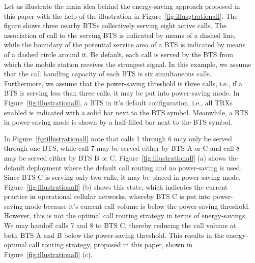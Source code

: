 Let us illustrate the main idea behind the energy-saving approach proposed in this paper with the help of the illustration in Figure~\ref{fig:illusgtrationall}. The figure shows three nearby BTSs collectively serving eight active calls. The association of call to the serving BTS is indicated by means of a dashed line, while the boundary of the potential service area of a BTS is indicated by means of a dashed circle around it. Be default, each call is served by the BTS from which the mobile station receives the strongest signal. In this example, we assume that the call handling capacity of each BTS is six simultaneous calls. Furthermore, we assume that the power-saving threshold is three calls, i.e., if a BTS is serving less than three calls, it may be put into power-saving mode. In Figure~\ref{fig:illustrationall}, a BTS in it's default configuration, i.e., all TRXs enabled is indicated with a solid bar next to the BTS symbol. Meanwhile, a BTS in power-saving mode is shown by a half-filled bar next to the BTS symbol.


In Figure~\ref{fig:illustrationall} note that calls 1 through 6 may only be served through one BTS, while call 7 may be served either by BTS A or C and call 8 may be served either by BTS B or C. Figure~\ref{fig:illustrationall} (a) shows the default deployment where the default call routing and no power-saving is used. Since BTS C is serving only two calls, it may be placed in power-saving mode. Figure~\ref{fig:illustrationall} (b) shows this state, which indicates the current practice in operational cellular networks, whereby BTS C is put into power-saving mode because it's current call volume is below the power-saving threshold. However, this is not the optimal call routing strategy in terms of energy-savings. We may handoff calls 7 and 8 to BTS C, thereby reducing the call volume at both BTS A and B below the power-saving threshold. This results in the energy-optimal call routing strategy, proposed in this paper, shown in Figure~\ref{fig:illustrationall} (c). 


